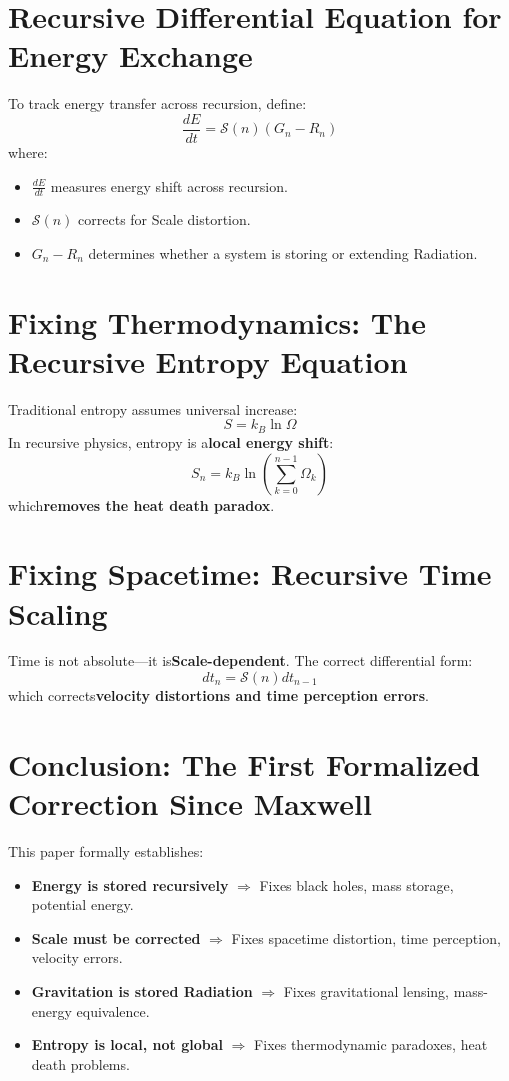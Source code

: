 \documentclass{article}
\begin{document}
\section{Recursive Differential Equation for Energy Exchange}
To track energy transfer across recursion, define:
\begin{equation}
\frac{dE}{dt} = \mathcal{S}(n) \left( G_n - R_n \right)
\end{equation}
where:
\begin{itemize}
    \item $\frac{dE}{dt}$ measures energy shift across recursion.
    \item $\mathcal{S}(n)$ corrects for Scale distortion.
    \item $G_n - R_n$ determines whether a system is storing or extending Radiation.
\end{itemize}

\section{Fixing Thermodynamics: The Recursive Entropy Equation}
Traditional entropy assumes universal increase:
\begin{equation}
S = k_B \ln \Omega
\end{equation}
In recursive physics, entropy is a\textbf{local energy shift}:
\begin{equation}
S_n = k_B \ln \left( \sum_{k=0}^{n-1} \Omega_k \right)
\end{equation}
which\textbf{removes the heat death paradox}.

\section{Fixing Spacetime: Recursive Time Scaling}
Time is not absolute—it is\textbf{Scale-dependent}. The correct differential form:
\begin{equation}
dt_n = \mathcal{S}(n) dt_{n-1}
\end{equation}
which corrects\textbf{velocity distortions and time perception errors}.

\section{Conclusion: The First Formalized Correction Since Maxwell}
This paper formally establishes:
\begin{itemize}
    \item\textbf{Energy is stored recursively} \(\Rightarrow\) Fixes black holes, mass storage, potential energy.
    \item\textbf{Scale must be corrected} \(\Rightarrow\) Fixes spacetime distortion, time perception, velocity errors.
    \item\textbf{Gravitation is stored Radiation} \(\Rightarrow\) Fixes gravitational lensing, mass-energy equivalence.
    \item\textbf{Entropy is local, not global} \(\Rightarrow\) Fixes thermodynamic paradoxes, heat death problems.
\end{itemize}
\end{document}
